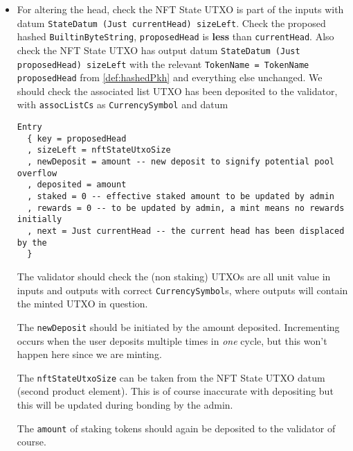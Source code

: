 \documentclass[10pt, a4paper]{article}
\theoremstyle{definition}
\begin{document}
\begin{enumerate}
{\begin{itemize}
{The \texttt{newDeposit} should be initiated by the amount deposited. Incrementing occurs when the user deposits multiple times in \textit{one} cycle, but this won't happen here since we are minting.

The \texttt{nftStateUtxoSize} can be taken from the NFT State UTXO datum (second product element). This is of course inaccurate with depositing but this will be updated during bonding by the admin.

The \texttt{amount} of staking UTXOs should be deposited to the validator of course.

Note: the initial head stake is equivalent to an initial tail stake so do not define the latter.
}

\item{
For altering the head, check the NFT State UTXO is part of the inputs with datum \texttt{StateDatum (Just currentHead) sizeLeft}. Check the proposed hashed \texttt{BuiltinByteString}, \texttt{proposedHead} is \textbf{less} than \texttt{currentHead}. Also check the NFT State UTXO has output datum \texttt{StateDatum (Just proposedHead) sizeLeft} with the relevant \texttt{TokenName = TokenName proposedHead} from \ref{def:hashedPkh} and everything else unchanged. We should check the associated list UTXO has been deposited to the validator, with \texttt{assocListCs} as \texttt{CurrencySymbol} and datum
\begin{verbatim}
Entry
  { key = proposedHead
  , sizeLeft = nftStateUtxoSize
  , newDeposit = amount -- new deposit to signify potential pool overflow
  , deposited = amount
  , staked = 0 -- effective staked amount to be updated by admin
  , rewards = 0 -- to be updated by admin, a mint means no rewards initially
  , next = Just currentHead -- the current head has been displaced by the
  }
\end{verbatim}
The validator should check the (non staking) UTXOs are all unit value in inputs and outputs with correct \texttt{CurrencySymbol}s, where outputs will contain the minted UTXO in question.

The \texttt{newDeposit} should be initiated by the amount deposited. Incrementing occurs when the user deposits multiple times in \textit{one} cycle, but this won't happen here since we are minting.

The \texttt{nftStateUtxoSize} can be taken from the NFT State UTXO datum (second product element). This is of course inaccurate with depositing but this will be updated during bonding by the admin.

The \texttt{amount} of staking tokens should again be deposited to the validator of course.
}

\end{itemize} 

}
\end{enumerate}
\end{document}
